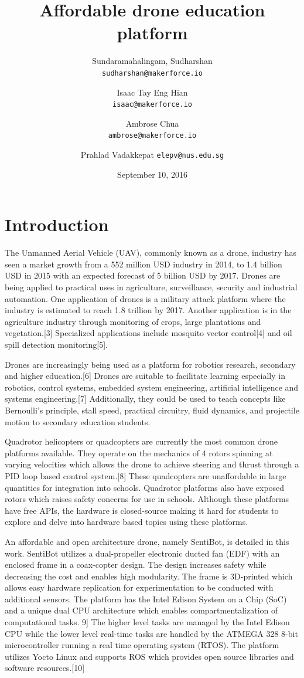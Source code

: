 \documentclass[12pt]{article}
\title{Affordable drone education platform}
\date{September 10, 2016}
\author{
	Sundaramahalingam, Sudharshan\\
	\texttt{sudharshan@makerforce.io}
	\and
	Isaac Tay Eng Hian\\
	\texttt{isaac@makerforce.io}
	\and
	Ambrose Chua\\
	\texttt{ambrose@makerforce.io}
	\and
	Prahlad Vadakkepat
	\texttt{elepv@nus.edu.sg}
}
\begin{document}
\maketitle
{}
\newpage
{}

\section{Introduction}

The Unmanned Aerial Vehicle (UAV), commonly known as a drone, industry has seen a market growth from a 552 million USD industry in 2014, to 1.4 billion USD in 2015 with an expected forecast of 5 billion USD by 2017.\cite{legalandsocial} Drones are being applied to practical uses in agriculture, surveillance, security and industrial automation. One application of drones is a military attack platform where the industry is estimated to reach 1.8 trillion by 2017.\cite{dronewars} Another application is in the agriculture industry through monitoring of crops, large plantations and vegetation.[3] Specialized applications include mosquito vector control[4] and oil spill detection monitoring[5]. 

Drones are increasingly being used as a platform for robotics research, secondary and higher education.[6] Drones are suitable to facilitate learning especially in robotics, control systems, embedded system engineering, artificial intelligence and systems engineering.[7] Additionally, they could be used to teach concepts like Bernoulli’s principle, stall speed, practical circuitry, fluid dynamics, and projectile motion to secondary education students.

Quadrotor helicopters or quadcopters are currently the most common drone platforms available. They operate on the mechanics of 4 rotors spinning at varying velocities which allows the drone to achieve steering and thrust through a PID loop based control system.[8] These quadcopters are unaffordable in large quantities for integration into schools. Quadrotor platforms also have exposed rotors which raises safety concerns for use in schools. Although these platforms have free APIs, the hardware is closed-source making it hard for students to explore and delve into hardware based topics using these platforms.

An affordable and open architecture drone, namely SentiBot, is detailed in this work. SentiBot utilizes a dual-propeller electronic ducted fan (EDF) with an enclosed frame in a coax-copter design. The design increases safety while decreasing the cost and enables high modularity. The frame is 3D-printed which allows easy hardware replication for experimentation to be conducted with additional sensors. The platform has the Intel Edison System on a Chip (SoC) and a unique dual CPU architecture which enables compartmentalization of computational tasks. 9] The higher level tasks are managed by the Intel Edison CPU while the lower level real-time tasks are handled by the ATMEGA 328 8-bit microcontroller running a real time operating system (RTOS). The platform utilizes Yocto Linux and supports ROS which provides open source libraries and software resources.[10]
\end{document}
